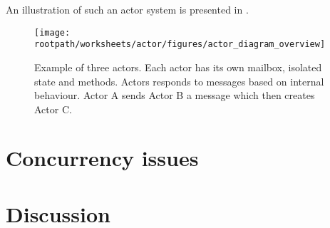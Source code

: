 An illustration of such an actor system is presented in .




\begin{figure}[ht!]
\centering
\texttt{[image: \\rootpath/worksheets/actor/figures/actor\_diagram\_overview]}
\caption{Example of three actors. Each actor has its own mailbox, isolated state and methods. Actors responds to messages based on internal behaviour. Actor A sends Actor B a message which then creates Actor C.}\label{fig:actor_overview}
\end{figure}




\section{Concurrency issues}\label{sec:actor_con_issues}




\section{Discussion}\label{sec:actor_discussion}

